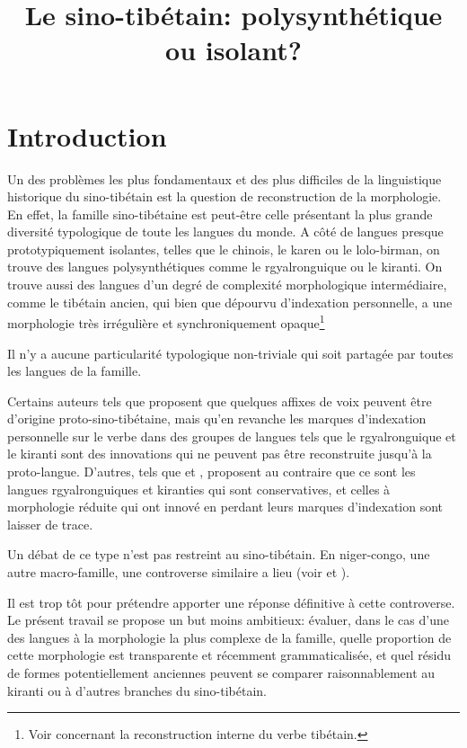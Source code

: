 \documentclass[oldfontcommands,oneside,a4paper,11pt]{article}
\begin{document}
 
\title{Le sino-tibétain: polysynthétique ou isolant?  }
\maketitle
\linenumbers

\section{Introduction}
Un des problèmes les plus fondamentaux et des plus difficiles de la linguistique historique du sino-tibétain est la question de reconstruction de la morphologie. En effet, la famille sino-tibétaine est peut-être celle présentant la plus grande diversité typologique de toute les langues du monde. A côté de langues presque prototypiquement isolantes, telles que le chinois, le karen ou le lolo-birman, on trouve des langues polysynthétiques comme le rgyalronguique ou le kiranti. On trouve aussi des langues d'un degré de complexité morphologique intermédiaire, comme le tibétain ancien, qui bien que dépourvu d'indexation personnelle, a une morphologie très irrégulière et synchroniquement opaque\footnote{Voir \citet{hill05vbri, jacques10ndr, jacques12internal, hill14dempsey, hill14voicing, hill15lan} concernant la reconstruction interne du verbe tibétain.}

 


 Il n'y a aucune particularité typologique non-triviale qui soit partagée par toutes les langues de la famille. 

Certains auteurs tels que  \citet{lapolla03} proposent que quelques affixes de voix peuvent être d'origine proto-sino-tibétaine, mais qu'en revanche les marques d'indexation personnelle sur le verbe dans des groupes de langues tels que le rgyalronguique et le kiranti sont des innovations qui ne peuvent pas être reconstruite jusqu'à la proto-langue. D'autres, tels que  \citet{driem93agreement}  et \citet{delancey10agreement}, proposent au contraire que ce sont les langues rgyalronguiques et kiranties qui sont conservatives, et celles à morphologie réduite qui ont innové en perdant leurs marques d'indexation sont laisser de trace.


Un débat de ce type n'est pas restreint au sino-tibétain. En niger-congo, une autre macro-famille, une controverse similaire a lieu (voir  \citealt{guldeman08macrosudan} et  \citealt{hyman11macrosudan}). 

Il est trop tôt pour prétendre apporter une réponse définitive à cette controverse. Le présent travail se propose un but moins ambitieux: évaluer, dans le cas d'une des langues à la morphologie la plus complexe de la famille, quelle proportion de cette morphologie est transparente et récemment grammaticalisée, et quel résidu de formes potentiellement anciennes peuvent se comparer raisonnablement au kiranti ou à d'autres branches du sino-tibétain. 
\end{document}
